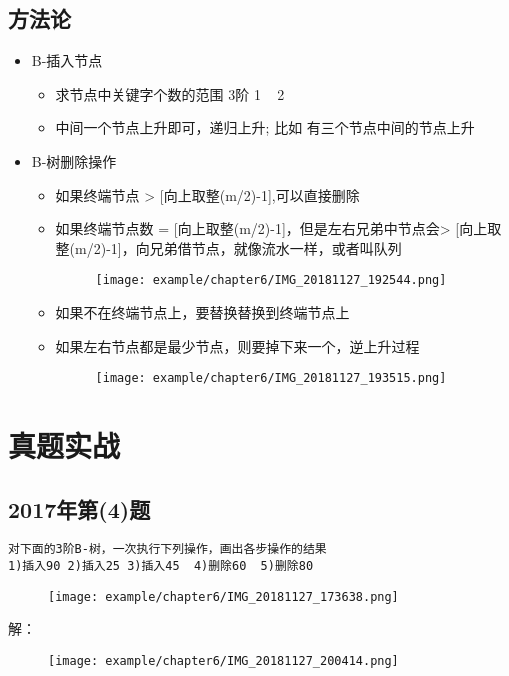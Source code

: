 \subsection{方法论}
\begin{itemize}[noitemsep,topsep=0pt,parsep=0pt,partopsep=0pt]
	\item B-插入节点
	\begin{itemize}[noitemsep,topsep=0pt,parsep=0pt,partopsep=0pt]
	    \item 求节点中关键字个数的范围  3阶  1 ~ 2
		\item 中间一个节点上升即可，递归上升; 比如 有三个节点中间的节点上升
	\end{itemize}
	\item B-树删除操作
	\begin{itemize}[noitemsep,topsep=0pt,parsep=0pt,partopsep=0pt]
			\item 如果终端节点 > [向上取整(m/2)-1],可以直接删除
			\item 	如果终端节点数 = [向上取整(m/2)-1]，但是左右兄弟中节点会> [向上取整(m/2)-1]，向兄弟借节点，就像流水一样，或者叫队列
			\begin{figure}[H]
				\centering  %
				\texttt{[image: example/chapter6/IMG\_20181127\_192544.png]}
			\end{figure}

			\item 如果不在终端节点上，要替换替换到终端节点上
			\item 如果左右节点都是最少节点，则要掉下来一个，{\color{red}逆上升过程}

			\begin{figure}[H]
				\centering  %
				\texttt{[image: example/chapter6/IMG\_20181127\_193515.png]}
			\end{figure}
	\end{itemize}
\end{itemize}

\section{真题实战}


\subsection{2017年第(4)题}

\begin{lstlisting}[basicstyle=\small\ttfamily, caption={}, numbers=none]
对下面的3阶B-树，一次执行下列操作，画出各步操作的结果
1)插入90 2)插入25 3)插入45  4)删除60  5)删除80
\end{lstlisting}
\begin{figure}[H]
	\centering  %
	\texttt{[image: example/chapter6/IMG\_20181127\_173638.png]}
\end{figure}
解：\newline
\begin{figure}[H]
	\centering  %
	\texttt{[image: example/chapter6/IMG\_20181127\_200414.png]}
\end{figure}


